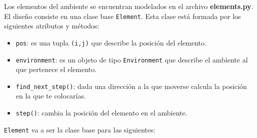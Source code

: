 \documentclass[12pt,a4paper]{article}
\begin{document}
	Los elementos del ambiente se encuentran modelados en el archivo \textbf{elements.py}. El dise\~no consiste en una clase base \texttt{Element}. Esta clase est\'a formada por los siguientes atributos y m\'etodos:
	\begin{itemize}
		\item \texttt{pos}: es una tupla \texttt{(i,j)} que describe la posici\'on del elemento.
		\item \texttt{environment}: es un objeto de tipo \texttt{Environment} que describe el ambiente al que pertenece el elemento.
		\item \texttt{find\_next\_step()}: dada una direcci\'on a la que moverse calcula la posici\'on en la que te colocar\'ias.
		\item \texttt{step()}: cambia la posici\'on del elemento en el ambiente.
	\end{itemize}	
	\texttt{Element} va a ser la clase base para las siguientes:
\end{document}
